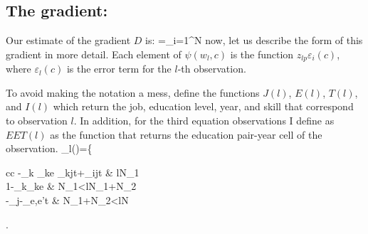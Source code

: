 \documentclass[a4paper, 12pt]{article}
\begin{document}
\subsection{The gradient:}
Our estimate of the gradient $D$ is:
\beqns
	=\sum_{i=1}^N
\eeqns
now, let us describe the form of this gradient in more detail. Each element of $\psi(w_l,c)$ is the function $z_{lp}\varepsilon_i(c)$, where $\varepsilon_l(c)$ is the error term for the $l$-th observation.   

To avoid making the notation a mess, define the functions $J(l)$, $E(l)$, $T(l)$, and $I(l)$ which return the job, education level, year, and skill that correspond to observation $l$. In addition, for the third equation observations I define as $EET(l)$ as the function that returns the education pair-year cell of the observation.
\beqns
	\varepsilon_l(\mu)=\left\{\begin{array}{cc}
		\Delta {}-\sum_k \theta_{ke} \pi_{kjt}+\pi_{ijt} & l\leq N_1 \\
		1-\sum_k\theta_{ke}    & N_1<l\leq N_1+N_2	 \\
		\Delta  {}-\beta_j-\gamma_{e,e't} & N_1+N_2<l\leq N 
	\end{array}\right.
\eeqns
\end{document}
